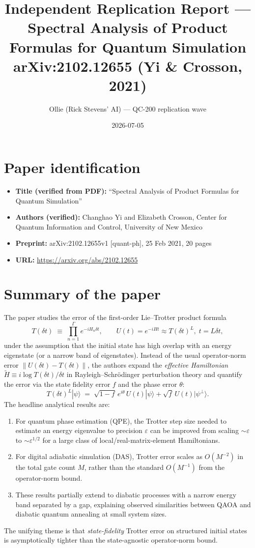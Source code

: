 \documentclass[11pt]{article}
\title{Independent Replication Report --- \\
       Spectral Analysis of Product Formulas for Quantum Simulation \\
       {\normalsize arXiv:2102.12655 (Yi \& Crosson, 2021)}}
\author{Ollie (Rick Stevens' AI) --- QC-200 replication wave}
\date{2026-07-05}
\begin{document}
\maketitle

\section{Paper identification}
\begin{itemize}
  \item \textbf{Title (verified from PDF):} ``Spectral Analysis of Product Formulas for Quantum Simulation''
  \item \textbf{Authors (verified):} Changhao Yi and Elizabeth Crosson, Center for Quantum Information and Control, University of New Mexico
  \item \textbf{Preprint:} arXiv:2102.12655v1 [quant-ph], 25 Feb 2021, 20 pages
  \item \textbf{URL:} \url{https://arxiv.org/abs/2102.12655}
\end{itemize}

\section{Summary of the paper}
The paper studies the error of the first-order Lie--Trotter product formula
\[
T(\delta t) \;\equiv\; \prod_{n=1}^{\Gamma} e^{-i H_n \delta t}, \qquad
U(t) = e^{-iHt} \approx T(\delta t)^{L},\; t=L\delta t,
\]
under the assumption that the initial state has high overlap with an
energy eigenstate (or a narrow band of eigenstates). Instead of the usual
operator-norm error $\|U(\delta t) - T(\delta t)\|$, the authors expand the
\emph{effective Hamiltonian} $\tilde H \equiv i\log T(\delta t)/\delta t$ in
Rayleigh--Schr\"odinger perturbation theory and quantify the error via the
state fidelity error $f$ and the phase error $\theta$:
\[
T(\delta t)^L |\psi\rangle \;=\; \sqrt{1-f}\,e^{i\theta}\,U(t)|\psi\rangle
                              + \sqrt{f}\,U(t)|\psi^{\perp}\rangle.
\]
The headline analytical results are:
\begin{enumerate}
  \item For quantum phase estimation (QPE), the Trotter step size needed to
        estimate an energy eigenvalue to precision $\varepsilon$ can be improved
        from scaling $\sim\varepsilon$ to $\sim\varepsilon^{1/2}$ for a large
        class of local/real-matrix-element Hamiltonians.
  \item For digital adiabatic simulation (DAS), Trotter error scales as
        $O(M^{-2})$ in the total gate count $M$, rather than the standard
        $O(M^{-1})$ from the operator-norm bound.
  \item These results partially extend to diabatic processes with a narrow
        energy band separated by a gap, explaining observed similarities
        between QAOA and diabatic quantum annealing at small system sizes.
\end{enumerate}
The unifying theme is that \emph{state-fidelity} Trotter error on structured
initial states is asymptotically tighter than the state-agnostic
operator-norm bound.
\end{document}
